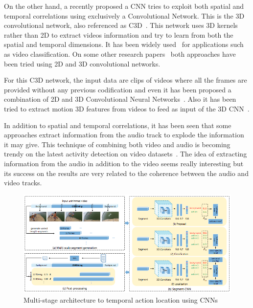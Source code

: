 On the other hand, a recently proposed a CNN tries to exploit both spatial and temporal correlations using exclusively a Convolutional Network. This is the 3D convolutional network, also referenced as C3D~\cite{tran2014learning}. This network uses 3D kernels rather than 2D to extract videos information and try to learn from both the spatial and temporal dimensions. It has been widely used~\cite{baccouche2011sequential,tran2015deep,tran2014learning,shoutemporal} for applications such as video classification. On some other research papers~\cite{yao2015describing,zhang2016modelling} both approaches have been tried using 2D and 3D convolutional networks.

For this C3D network, the input data are clips of videos where all the frames are provided without any previous codification and even it has been proposed a combination of 2D and 3D Convolutional Neural Networks~\cite{Ng_2015_CVPR,yao2015describing}. Also it has been tried to extract motion 3D features from videos to feed as input of the 3D CNN~\cite{yao2015describing}.

In addition to spatial and temporal correlations, it has been seen that some approaches extract information from the audio track to explode the information it may give. This technique of combining both video and audio is becoming trendy on the latest activity detection on video datasets~\cite{xu2015uts}. The idea of extracting information from the audio in addition to the video seems really interesting but its success on the results are very related to the coherence between the audio and video tracks.

\begin{figure}[ht]
\begin{center}
\includegraphics[width=1\linewidth]{img/stateofart/multistage}
\end{center}
\caption{Multi-stage architecture to temporal action location using CNNs}
\label{fig:multistage}
\end{figure}

